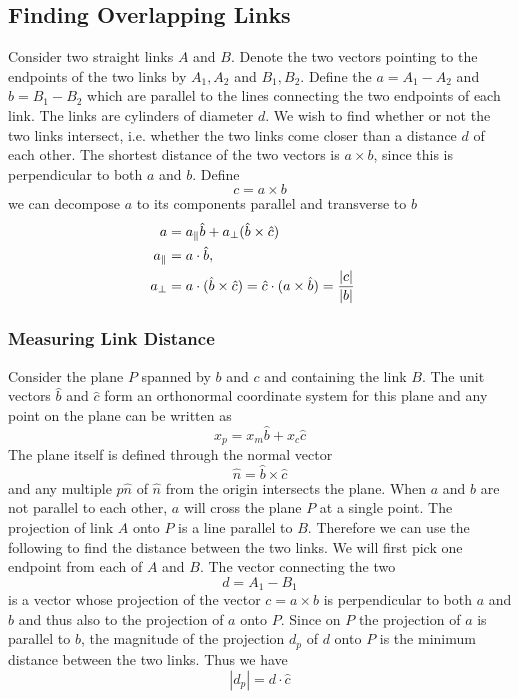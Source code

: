 \documentclass[endfloats,nofootinbib,preprint,floatfix,titlepage,superscriptaddress]{revtex4} %
\begin{document}
\subsection{Finding Overlapping Links}
Consider two straight links $A$ and $B$. Denote the two vectors pointing to the endpoints of the two links by $A_1,A_2$ and $B_1,B_2$. Define the $a= A_1 - A_2$ and $ b= B_1 -B_2$ which are parallel to the lines connecting the two endpoints of each link. The links are cylinders of diameter $d$. We wish to find whether or not the two links intersect, i.e. whether the two links come closer than a distance $d$ of each other. The shortest distance of the two vectors is $a \times b$, since this is perpendicular to both $a$ and $b$. Define
\[c = a\times b\]
we can decompose $ a$ to its components parallel and transverse to $b$ 
\begin{align}
a &= a_\parallel \hat{b}+ a_\perp (\hat{b}\times \hat{c})\cr
a_\parallel &= a\cdot \hat{b}, \cr
a_\perp &= a \cdot (\hat{b}\times \hat{c}) = \hat{c} \cdot (a\times \hat{b})= {|c|\over |b|}
\end{align}

\subsubsection{Measuring Link Distance}
Consider the plane $P$ spanned by $b$ and $c$ and containing the link $B$. The unit vectors $\hat{b}$ and $\hat{c}$ form an orthonormal coordinate system for this plane and any point on the plane can be written as
\[x_p = x_m \hat{b}+ x_c\hat{c}\]
The plane itself is defined through the normal vector 
\[\hat{n}= \hat{b}\times\hat{c}\]
and any multiple $p\hat{n}$ of $\hat{n}$ from the origin intersects the plane.
When $ a$ and $b$ are not parallel to each other, $a$ will cross the plane $P$ at a single point. The projection of link $A$ onto $P$ is a line parallel to $B$. Therefore we can use the following to find the distance between the two links. We will first pick one endpoint from each of $A$ and $B$. The vector connecting the two
\[d = A_1-B_1\]
is a vector whose projection of the vector $c = a\times b$ is perpendicular to both $a$ and $b$ and thus also to the projection of $a$ onto $P$. Since on $P$ the projection of $a$ is parallel to $b$, the magnitude of the projection $d_p$ of $d$ onto $P$ is the minimum distance between the two links. Thus we have
\[|d_p| = d \cdot \hat{c}\]
\end{document}
